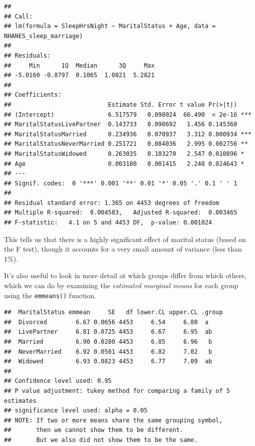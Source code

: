 \documentclass[
  12pt,
]{book}
\newenvironment{Shaded}{\begin{snugshade}}{\end{snugshade}}
\newcommand{\AttributeTok}[1]{\textcolor[rgb]{0.13,0.29,0.53}{#1}}
\newcommand{\CommentTok}[1]{\textcolor[rgb]{0.56,0.35,0.01}{\textit{#1}}}
\newcommand{\DecValTok}[1]{\textcolor[rgb]{0.00,0.00,0.81}{#1}}
\newcommand{\FunctionTok}[1]{\textcolor[rgb]{0.13,0.29,0.53}{\textbf{#1}}}
\newcommand{\NormalTok}[1]{#1}
\newcommand{\OtherTok}[1]{\textcolor[rgb]{0.56,0.35,0.01}{#1}}
\newcommand{\SpecialCharTok}[1]{\textcolor[rgb]{0.81,0.36,0.00}{\textbf{#1}}}
\newcommand{\StringTok}[1]{\textcolor[rgb]{0.31,0.60,0.02}{#1}}
\begin{document}
\begin{verbatim}
## 
## Call:
## lm(formula = SleepHrsNight ~ MaritalStatus + Age, data = NHANES_sleep_marriage)
## 
## Residuals:
##     Min      1Q  Median      3Q     Max 
## -5.0160 -0.8797  0.1065  1.0821  5.2821 
## 
## Coefficients:
##                           Estimate Std. Error t value Pr(>|t|)    
## (Intercept)               6.517579   0.098024  66.490  < 2e-16 ***
## MaritalStatusLivePartner  0.143733   0.098692   1.456 0.145360    
## MaritalStatusMarried      0.234936   0.070937   3.312 0.000934 ***
## MaritalStatusNeverMarried 0.251721   0.084036   2.995 0.002756 ** 
## MaritalStatusWidowed      0.263035   0.103270   2.547 0.010896 *  
## Age                       0.003180   0.001415   2.248 0.024643 *  
## ---
## Signif. codes:  0 '***' 0.001 '**' 0.01 '*' 0.05 '.' 0.1 ' ' 1
## 
## Residual standard error: 1.365 on 4453 degrees of freedom
## Multiple R-squared:  0.004583,   Adjusted R-squared:  0.003465 
## F-statistic:   4.1 on 5 and 4453 DF,  p-value: 0.001024
\end{verbatim}

This tells us that there is a highly significant effect of marital status (based on the F test), though it accounts for a very small amount of variance (less than 1\%).

It's also useful to look in more detail at which groups differ from which others, which we can do by examining the \emph{estimated marginal means} for each group using the \texttt{emmeans()} function.

\begin{Shaded}
\end{Shaded}

\begin{verbatim}
##  MaritalStatus emmean     SE   df lower.CL upper.CL .group
##  Divorced        6.67 0.0656 4453     6.54     6.80  a    
##  LivePartner     6.81 0.0725 4453     6.67     6.95  ab   
##  Married         6.90 0.0280 4453     6.85     6.96   b   
##  NeverMarried    6.92 0.0501 4453     6.82     7.02   b   
##  Widowed         6.93 0.0823 4453     6.77     7.09  ab   
## 
## Confidence level used: 0.95 
## P value adjustment: tukey method for comparing a family of 5 estimates 
## significance level used: alpha = 0.05 
## NOTE: If two or more means share the same grouping symbol,
##       then we cannot show them to be different.
##       But we also did not show them to be the same.
\end{verbatim}
\end{document}
